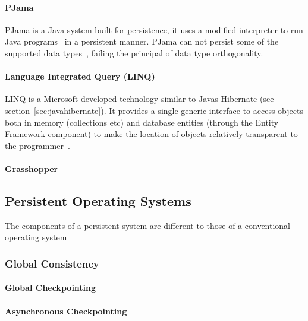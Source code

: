 \documentclass[a4paper,12pt]{article}
\begin{document}
\paragraph{PJama}\label{sec:pjama}
PJama is a Java system built for persistence, it uses a modified interpreter to run Java programs~\citep{persistentjavasystem} in a persistent manner. PJama can not persist some of the supported data types~\citep{ADearle}, failing the principal of data type orthogonality. 
\par
\paragraph{Language Integrated Query (LINQ)}
LINQ is a Microsoft developed technology similar to Javas Hibernate (see section~\ref{sec:javahibernate}). It provides a single generic interface to access objects both in memory (collections etc) and database entities (through the Entity Framework component) to make the location of objects relatively transparent to the programmer~\citep{ADearle}.
\par
\paragraph{Grasshopper}\label{sec:grasshopper}
\par
\subsection{Persistent Operating Systems}\label{sec:persistentOS}
The components of a persistent system are different to those of a conventional operating system~\citep{Grasshopper} 
\subsubsection{Global Consistency}
\paragraph{Global Checkpointing}
\par
\paragraph{Asynchronous Checkpointing}
\par
\end{document}
